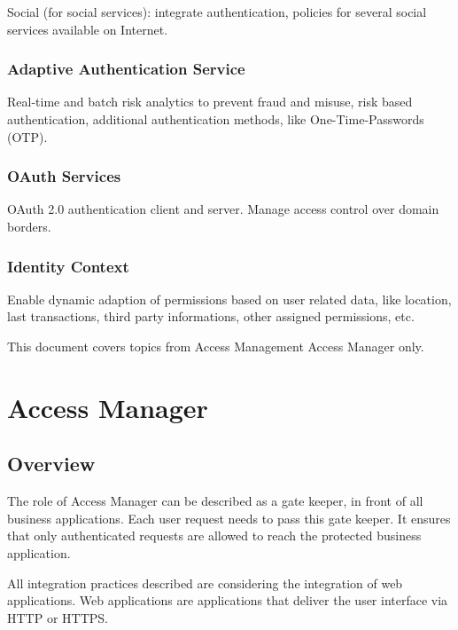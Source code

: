 \documentclass[11pt]{report}
\begin{document}
Social (for social services): integrate authentication, policies for
several social services available on Internet.


\subsection{Adaptive Authentication Service}

Real-time and batch risk analytics to prevent fraud and misuse, risk
based authentication, additional authentication methods, like
One-Time-Passwords (OTP).


\subsection{OAuth Services}

OAuth 2.0 authentication client and server. Manage access control over
domain borders.


\subsection{Identity Context}

Enable dynamic adaption of permissions based on user related data, like
location, last transactions, third party informations, other assigned
permissions, etc.


This document covers topics from Access Management Access Manager only.



\chapter{Access Manager}


\section{Overview}

The role of Access Manager can be described as a gate keeper, in front
of all business applications. Each user request needs to pass this gate
keeper. It ensures that only authenticated requests are allowed to reach
the protected business application.

\begin{framed}

    All integration practices described are considering the integration
    of web applications. Web applications are applications that deliver 
    the user interface via HTTP or HTTPS\@.

\end{framed}
\end{document}
